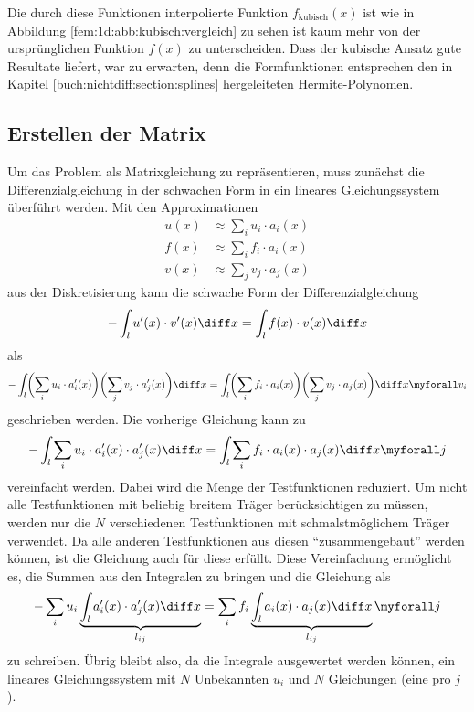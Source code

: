 Die durch diese Funktionen interpolierte Funktion $f_\text{kubisch} (x)$ ist wie in Abbildung \ref{fem:1d:abb:kubisch:vergleich} zu sehen ist kaum mehr von der ursprünglichen Funktion $f(x)$ zu unterscheiden.
Dass der kubische Ansatz gute Resultate liefert, war zu erwarten, denn die Formfunktionen entsprechen den in Kapitel \ref{buch:nichtdiff:section:splines} hergeleiteten Hermite-Polynomen.


\subsection{Erstellen der Matrix\label{fem:1d:matrix_erstellen}}
Um das Problem als Matrixgleichung zu repräsentieren, muss zunächst die Differenzialgleichung in der schwachen Form in ein lineares Gleichungssystem überführt werden.
Mit den Approximationen 
\begin{align}
    u(x) &\approx \sum_i u_i \cdot a_i(x) \\
    f(x) &\approx \sum_i f_i \cdot a_i(x) \\
    v(x) &\approx \sum_j v_j \cdot a_j(x)
\end{align}
aus der Diskretisierung kann die schwache Form der Differenzialgleichung 
\begin{equation}
    - \int_l u'(x) \cdot v'(x) \diff x = \int_l f(x) \cdot v(x) \diff x
\end{equation}
als
\begin{equation}
    - \int_l \biggl(\sum_i u_i \cdot a'_i(x)\biggr) \biggl(\sum_j v_j \cdot a'_j(x)\biggr) \diff x 
    = \int_l \biggl(\sum_i f_i \cdot a_i(x) \biggr) \biggl(\sum_j v_j \cdot a_j(x) \biggr) \diff x 
    \myforall v_i
\end{equation}
geschrieben werden.
Die vorherige Gleichung kann zu
\begin{equation}
    - \int_l \sum_i u_i \cdot a'_i(x) \cdot a'_j(x) \diff x = \int_l \sum_i f_i \cdot a_i(x) \cdot a_j(x) \diff x \myforall j
\end{equation}
vereinfacht werden.
Dabei wird die Menge der Testfunktionen reduziert.
Um nicht alle Testfunktionen mit beliebig breitem Träger berücksichtigen zu müssen, werden nur die $N$ verschiedenen Testfunktionen mit schmalstmöglichem Träger verwendet.
Da alle anderen Testfunktionen aus diesen ``zusammengebaut'' werden können, ist die Gleichung auch für diese erfüllt.
Diese Vereinfachung ermöglicht es, die Summen aus den Integralen zu bringen und die Gleichung als
\begin{equation}
    - \sum_i u_i \underbrace{\int_l a'_i(x) \cdot a'_j(x) \diff x}_{l_{ij}} = \sum_i f_i \underbrace{\int_l a_i(x) \cdot a_j(x) \diff x}_{l_{ij}} \myforall j \label{papers:fem:prinzip1d:finale_gleichung}
\end{equation}
zu schreiben.
Übrig bleibt also, da die Integrale ausgewertet werden können, ein lineares Gleichungssystem mit $N$ Unbekannten $u_i$ und $N$ Gleichungen (eine pro $j$). 

